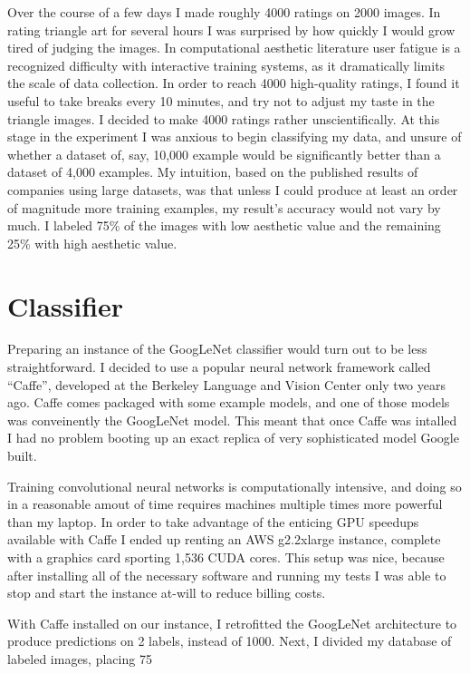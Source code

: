 \documentclass[midd]{thesis}
\begin{document}
Over the course of a few days I made roughly 4000 ratings on  2000 images. In rating triangle art for several hours I was surprised by how quickly I would grow tired of judging the images. In computational aesthetic literature user fatigue is a recognized difficulty with interactive training systems, as it dramatically limits the scale of data collection. In order to reach 4000 high-quality ratings, I found it useful to take breaks every 10 minutes, and try not to adjust my taste in the triangle images. I decided to make 4000 ratings rather unscientifically. At this stage in the experiment I was anxious to begin classifying my data, and unsure of whether a dataset of, say, 10,000 example would be significantly better than a dataset of 4,000 examples. My intuition, based on the published results of companies using large datasets, was that unless I could produce at least an order of magnitude more training examples, my result's accuracy would not vary by much. I labeled 75\% of the images with low aesthetic value and the remaining 25\% with high aesthetic value.


\section{Classifier}

Preparing an instance of the GoogLeNet classifier would turn out to be less straightforward. I decided to use a popular neural network framework called ``Caffe'', developed at the Berkeley Language and Vision Center only two years ago. Caffe comes packaged with some example models, and one of those models was conveinently the GoogLeNet model. This meant that once Caffe was intalled I had no problem booting up an exact replica of very sophisticated model Google built.

Training convolutional neural networks is computationally intensive, and doing so in a reasonable amout of time requires machines multiple times more powerful than my laptop. In order to take advantage of the enticing GPU speedups available with Caffe I ended up renting an AWS g2.2xlarge instance, complete with a graphics card sporting 1,536 CUDA cores. This setup was nice, because after installing all of the necessary software and running my tests I was able to stop and start the instance at-will to reduce billing costs.

With Caffe installed on our instance, I retrofitted the GoogLeNet architecture to produce predictions on 2 labels, instead of 1000. Next, I divided my database of labeled images, placing 75%
\end{document}
